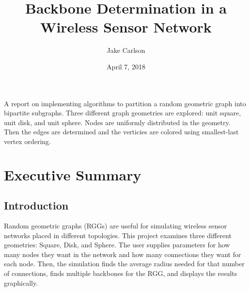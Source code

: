 \documentclass{article}
\begin{document}
\title{Backbone Determination in a Wireless Sensor Network}
\author{Jake Carlson}
\date{April 7, 2018}
\maketitle

\abstract
A report on implementing algorithms to partition a random geometric graph into bipartite subgraphs. Three different graph geometries are explored: unit square, unit disk, and unit sphere. Nodes are uniformly distributed in the geometry. Then the edges are determined and the verticies are colored using smallest-last vertex ordering.
\newpage

\tableofcontents
\lstlistoflistings
\newpage

\section{Executive Summary}

    \subsection{Introduction}
    Random geometric graphs (RGGs) are useful for simulating wireless sensor networks placed in different topologies. This project examines three different geometries: Square, Disk, and Sphere. The user supplies parameters for how many nodes they want in the network and how many connections they want for each node. Then, the simulation finds the average radius needed for that number of connections, finds multiple backbones for the RGG, and displays the results graphically.
\end{document}

